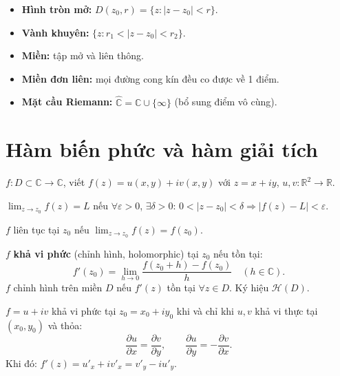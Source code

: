 \documentclass[12pt,a4paper]{article}
\begin{document}
\begin{dinhnghia}[title={Tô-pô mặt phẳng phức}]
  \begin{itemize}
    \item \textbf{Hình tròn mở:} $D(z_0, r) = \{z : |z - z_0| < r\}$.
    \item \textbf{Vành khuyên:} $\{z : r_1 < |z - z_0| < r_2\}$.
    \item \textbf{Miền:} tập mở và liên thông.
    \item \textbf{Miền đơn liên:} mọi đường cong kín đều co được về 1 điểm.
    \item \textbf{Mặt cầu Riemann:} $\hat{\mathbb{C}} = \mathbb{C} \cup \{\infty\}$ (bổ sung điểm vô cùng).
  \end{itemize}
\end{dinhnghia}

\section{Hàm biến phức và hàm giải tích}

\begin{dinhnghia}[title={Hàm biến phức}]
  $f: D \subset \mathbb{C} \to \mathbb{C}$, viết $f(z) = u(x, y) + iv(x, y)$ với $z = x + iy$, $u, v: \mathbb{R}^2 \to \mathbb{R}$.
\end{dinhnghia}

\begin{dinhnghia}[title={Giới hạn và liên tục}]
  $\displaystyle\lim_{z \to z_0} f(z) = L$ nếu $\forall \varepsilon > 0$, $\exists \delta > 0$: $0 < |z - z_0| < \delta \Rightarrow |f(z) - L| < \varepsilon$.

  $f$ liên tục tại $z_0$ nếu $\displaystyle\lim_{z \to z_0} f(z) = f(z_0)$.
\end{dinhnghia}

\begin{dinhnghia}[title={Đạo hàm phức --- Hàm chỉnh hình}]
  $f$ \textbf{khả vi phức} (chỉnh hình, holomorphic) tại $z_0$ nếu tồn tại:
  \[
    f'(z_0) = \lim_{h \to 0} \frac{f(z_0 + h) - f(z_0)}{h} \quad (h \in \mathbb{C}).
  \]
  $f$ chỉnh hình trên miền $D$ nếu $f'(z)$ tồn tại $\forall z \in D$. Ký hiệu $\mathcal{H}(D)$.
\end{dinhnghia}

\begin{dinhly}[title={Điều kiện Cauchy--Riemann}]
  $f = u + iv$ khả vi phức tại $z_0 = x_0 + iy_0$ khi và chỉ khi $u, v$ khả vi thực tại $(x_0, y_0)$ và thỏa:
  \[
    \frac{\partial u}{\partial x} = \frac{\partial v}{\partial y}, \qquad \frac{\partial u}{\partial y} = -\frac{\partial v}{\partial x}.
  \]
  Khi đó: $f'(z) = u'_x + iv'_x = v'_y - iu'_y$.
\end{dinhly}
\end{document}

